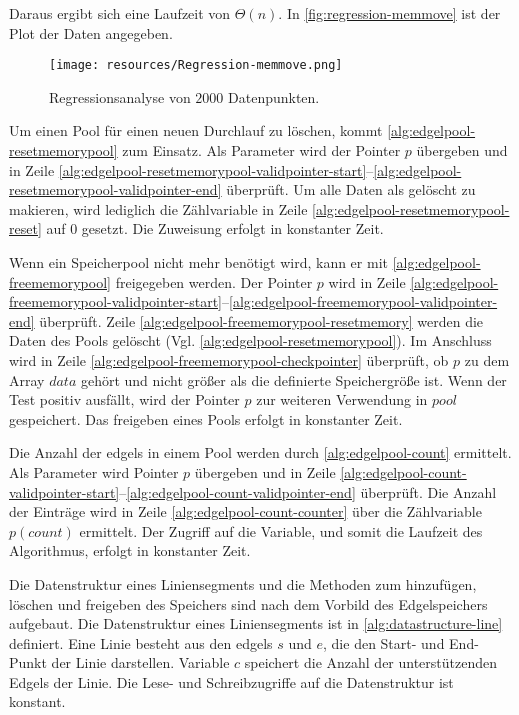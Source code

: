 Daraus ergibt sich eine Laufzeit von $\Theta(n)$. In \autoref{fig:regression-memmove} ist der Plot der Daten angegeben.

\begin{figure}[!ht]
	\centering
	\texttt{[image: resources/Regression-memmove.png]}
	\caption{Regressionsanalyse von $2000$ Datenpunkten.}
	\label{fig:regression-memmove}
\end{figure}

Um einen Pool für einen neuen Durchlauf zu löschen, kommt \autoref{alg:edgelpool-resetmemorypool} zum Einsatz. Als
 Parameter wird der Pointer $p$ übergeben und in Zeile
 \ref{alg:edgelpool-resetmemorypool-validpointer-start}--\ref{alg:edgelpool-resetmemorypool-validpointer-end}
 überprüft. Um alle Daten als gelöscht zu makieren, wird lediglich die Zählvariable in Zeile
 \ref{alg:edgelpool-resetmemorypool-reset} auf $0$ gesetzt. Die Zuweisung erfolgt in konstanter Zeit.



Wenn ein Speicherpool nicht mehr benötigt wird, kann er mit \autoref{alg:edgelpool-freememorypool} freigegeben werden.
 Der Pointer $p$ wird in Zeile
 \ref{alg:edgelpool-freememorypool-validpointer-start}--\ref{alg:edgelpool-freememorypool-validpointer-end} überprüft.
 Zeile \ref{alg:edgelpool-freememorypool-resetmemory} werden die Daten des Pools gelöscht
 (Vgl. \autoref{alg:edgelpool-resetmemorypool}). Im Anschluss wird in Zeile
 \ref{alg:edgelpool-freememorypool-checkpointer} überprüft, ob $p$ zu dem Array $\mathit{data}$ gehört und nicht größer
 als die definierte Speichergröße ist. Wenn der Test positiv ausfällt, wird der Pointer $p$ zur weiteren Verwendung in
 $\mathit{pool}$ gespeichert. Das freigeben eines Pools erfolgt in konstanter Zeit.



Die Anzahl der \gls{edgels} in einem Pool werden durch \autoref{alg:edgelpool-count} ermittelt. Als Parameter wird
 Pointer $p$ übergeben und in Zeile
 \ref{alg:edgelpool-count-validpointer-start}--\ref{alg:edgelpool-count-validpointer-end} überprüft. Die Anzahl der
 Einträge wird in Zeile \ref{alg:edgelpool-count-counter} über die Zählvariable $p(\mathit{count})$ ermittelt. Der
 Zugriff auf die Variable, und somit die Laufzeit des Algorithmus, erfolgt in konstanter Zeit.



Die Datenstruktur eines Liniensegments und die Methoden zum hinzufügen, löschen und freigeben des Speichers sind nach
 dem Vorbild des Edgelspeichers aufgebaut. Die Datenstruktur eines Liniensegments ist in
 \autoref{alg:datastructure-line} definiert. Eine Linie besteht aus den \gls{edgels} $s$ und $e$, die den Start- und
 End-Punkt der Linie darstellen. Variable $c$ speichert die Anzahl der unterstützenden Edgels der Linie. Die Lese- und
 Schreibzugriffe auf die Datenstruktur ist konstant.

